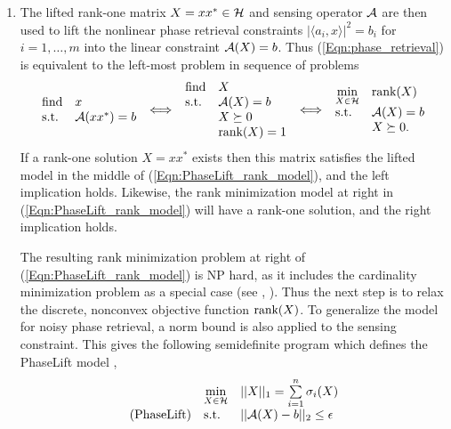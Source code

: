 \begin{enumerate}
\item

The lifted rank-one matrix $X = xx^* \in {\mathcal H}$ and sensing operator ${\mathcal A}$ are then used to lift the nonlinear phase retrieval constraints $| \langle a_i, x \rangle | ^2 = b_i$ for $i = 1, \ldots, m$ into the linear constraint ${\mathcal A}(X) = b$.  Thus (\ref{Eqn:phase_retrieval}) is equivalent to the left-most problem in sequence of problems
\begin{equation} 		\label{Eqn:PhaseLift_rank_model}
\begin{array}{ll}
		\textnormal{find}
		&	x
			\\
		\textnormal{s.t.}
		& 	{\mathcal A} (xx^*) = b
\end{array}
\iff
\begin{array}{ll}
		\textnormal{find}
		&	X
			\\
		\textnormal{s.t.}
		& 	{\mathcal A} (X) = b
			\\
		&	X \succeq 0
			\\
		&	\textnormal{rank}(X) = 1
\end{array}
\iff
\begin{array}{ll}
		\min\limits_{\substack{X \in {\mathcal H}}}
		&	\textnormal{rank}(X)
			\\
		\textnormal{s.t.}
		& 	{\mathcal A} (X) = b
			\\
		&	X \succeq 0.
\end{array}
\end{equation}
If a rank-one solution  $X = xx^*$ exists then this matrix satisfies the lifted model in the middle of (\ref{Eqn:PhaseLift_rank_model}), and the left implication holds.  Likewise, the rank minimization model at right in (\ref{Eqn:PhaseLift_rank_model}) will have a rank-one solution, and the right implication holds.  





The resulting rank minimization problem at right of (\ref{Eqn:PhaseLift_rank_model}) is NP hard, as it includes the cardinality minimization problem as a special case (see \cite{natarajan1995sparse}, \cite{recht2010guaranteed}).  Thus the next step is to relax the discrete, nonconvex objective function $\textnormal{rank}(X)$.  To generalize the model for noisy phase retrieval, a norm bound is also applied to the sensing constraint.  This gives the following semidefinite program which defines the PhaseLift model \cite{DBLP:journals/siamis/CandesESV13}, \cite{candes2013phaselift}
\begin{equation} \label{Eqn:PhaseLift}
\begin{array}{lll}
	&	\min\limits_{\substack{X \in {\mathcal H}}}
		&	||X||_1 = \sum\limits_{\substack{i=1}}^{\substack{n}} \sigma_i(X)
			\\
\textnormal{(PhaseLift)}
	&	\textnormal{s.t.}
		& 	||{\mathcal A} (X) - b||_2 \leq \epsilon
			\\


\end{array}
\end{equation}
\end{enumerate}
